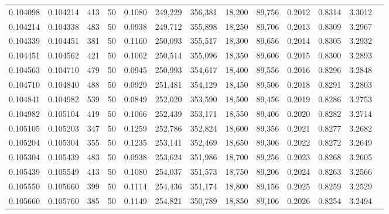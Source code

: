 \begin{tabular}{rrrrrrrrrrrrr}
0.104098 & 0.104214 &   413 &  50 &                                     0.1080 & 249,229 & 356,381 &  18,200 &  89,756 & 0.2012 & 0.8314 & 3.3012 \\
0.104214 & 0.104338 &   483 &  50 &                                     0.0938 & 249,712 & 355,898 &  18,250 &  89,706 & 0.2013 & 0.8309 & 3.2967 \\
0.104339 & 0.104451 &   381 &  50 &                                     0.1160 & 250,093 & 355,517 &  18,300 &  89,656 & 0.2014 & 0.8305 & 3.2932 \\
0.104451 & 0.104562 &   421 &  50 &                                     0.1062 & 250,514 & 355,096 &  18,350 &  89,606 & 0.2015 & 0.8300 & 3.2893 \\
0.104563 & 0.104710 &   479 &  50 &                                     0.0945 & 250,993 & 354,617 &  18,400 &  89,556 & 0.2016 & 0.8296 & 3.2848 \\
0.104710 & 0.104840 &   488 &  50 &                                     0.0929 & 251,481 & 354,129 &  18,450 &  89,506 & 0.2018 & 0.8291 & 3.2803 \\
0.104841 & 0.104982 &   539 &  50 &                                     0.0849 & 252,020 & 353,590 &  18,500 &  89,456 & 0.2019 & 0.8286 & 3.2753 \\
0.104982 & 0.105104 &   419 &  50 &                                     0.1066 & 252,439 & 353,171 &  18,550 &  89,406 & 0.2020 & 0.8282 & 3.2714 \\
0.105105 & 0.105203 &   347 &  50 &                                     0.1259 & 252,786 & 352,824 &  18,600 &  89,356 & 0.2021 & 0.8277 & 3.2682 \\
0.105204 & 0.105304 &   355 &  50 &                                     0.1235 & 253,141 & 352,469 &  18,650 &  89,306 & 0.2022 & 0.8272 & 3.2649 \\
0.105304 & 0.105439 &   483 &  50 &                                     0.0938 & 253,624 & 351,986 &  18,700 &  89,256 & 0.2023 & 0.8268 & 3.2605 \\
0.105439 & 0.105549 &   413 &  50 &                                     0.1080 & 254,037 & 351,573 &  18,750 &  89,206 & 0.2024 & 0.8263 & 3.2566 \\
0.105550 & 0.105660 &   399 &  50 &                                     0.1114 & 254,436 & 351,174 &  18,800 &  89,156 & 0.2025 & 0.8259 & 3.2529 \\
0.105660 & 0.105760 &   385 &  50 &                                     0.1149 & 254,821 & 350,789 &  18,850 &  89,106 & 0.2026 & 0.8254 & 3.2494 \\

\end{tabular}
